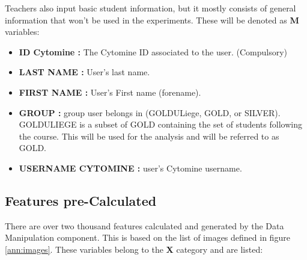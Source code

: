 \documentclass[a4paper,11pt]{report}
\numberwithin{figure}{section} %
\begin{document}
    Teachers also input basic student information, but it mostly consists of general information that won't be used in the experiments.
    These will be denoted as \textbf{M} variables:
   	\begin{itemize}
   	\item[\textbullet] \textbf{ID Cytomine :} The Cytomine ID associated to the user. (Compulsory)
    \item[\textbullet] \textbf{LAST NAME :} User's last name.
    \item[\textbullet] \textbf{FIRST NAME :} User's First name (forename).
    \item[\textbullet] \textbf{GROUP :} group user belongs in (GOLDULiege, GOLD, or SILVER).
    GOLDULIEGE is a subset of GOLD containing the set of students following the course.
    This will be used for the analysis and will be referred to as GOLD.
    \item[\textbullet] \textbf{USERNAME CYTOMINE :} user's Cytomine username.
   	\end{itemize}


    \subsection{Features pre-Calculated}

    There are over two thousand features calculated and generated by the Data Manipulation component.
    This is based on the list of images  defined in figure \ref{ann:images}.
    These variables belong to the \textbf{X} category and are listed:
\end{document}
